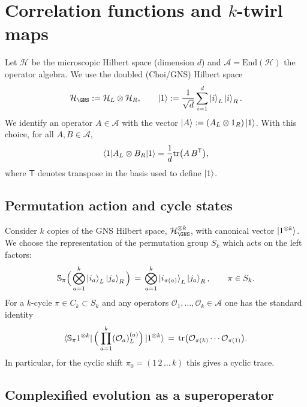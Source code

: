 \documentclass{article}
\theoremstyle{definition}
\newcommand{\mA}{\mathcal{A}}
\newcommand{\mH}{\mathcal{H}}
\newcommand{\mO}{\mathcal{O}}
\newcommand{\tr}{\text{tr}}
\begin{document}
    \section{Correlation functions and $k$-twirl maps}

    Let $\mH$ be the microscopic Hilbert space (dimension $d$) and $\mA=\mathrm{End}
    (\mH)$ the operator algebra. We use the doubled (Choi/GNS) Hilbert space
    \begin{equation}
        \mH_{\GNS}:=\mH_{L}\otimes \mH_{R}, \qquad \ket{1}:=\frac{1}{\sqrt{d}}\sum
        _{i=1}^{d}\ket{i}_{L}\ket{i}_{R}.
    \end{equation}
    We identify an operator $A\in\mA$ with the vector
    $\ket{A}:=(A_{L}\otimes 1_{R})\ket{1}$. With this choice, for all
    $A,B\in\mA$,
    \begin{equation}
        \braket{1|A_L\otimes B_R|1}=\frac{1}{d}\tr\big(A\,B^{\mathsf{T}}\big),
    \end{equation}
    where $\mathsf{T}$ denotes transpose in the basis used to define $\ket{1}$.

    \subsection*{Permutation action and cycle states}

    Consider $k$ copies of the GNS Hilbert space, $\mH_{\GNS}^{\otimes k}$, with
    canonical vector $\ket{1^{\otimes k}}$. We choose the representation of the permutation
    group $S_{k}$ which acts on the left factors:
    \begin{equation}
        \mathbb{S}_{\pi}\Big(\bigotimes_{a=1}^{k}\ket{i_a}_{L}\ket{j_a}_{R}\Big)
        \,=\,\bigotimes_{a=1}^{k}\ket{i_{\pi(a)}}_{L}\ket{j_a}_{R},\qquad \pi\in
        S_{k}.
    \end{equation}
    For a $k$-cycle $\pi\in C_{k}\subset S_{k}$ and any operators
    $\mO_{1},\dots, \mO_{k}\in\mA$ one has the standard identity
    \begin{equation}
        \bra{\mathbb{S}_\pi 1^{\otimes k}}\Big(\prod_{a=1}^{k}(\mO_{a})_{L}^{(a)}
        \Big)\ket{1^{\otimes k}}\,=\,\tr\big(\mO_{\pi(k)}\cdots \mO_{\pi(1)}\big)
        .
    \end{equation}
    In particular, for the cyclic shift $\pi_{0}=(1\,2\,\dots\,k)$ this gives a cyclic
    trace.

    \subsection*{Complexified evolution as a superoperator}
\end{document}
